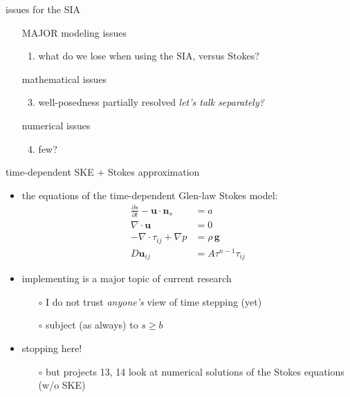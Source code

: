 \documentclass[10pt,dvipsnames]{beamer}
\newcommand{\comm}[1]{{\footnotesize \hfill \emph{#1}}}
\begin{document}
\begin{frame}{issues for the SIA}
\begin{itemize}
\item[] \alert{MAJOR modeling issues}
    \begin{enumerate}
    \item what do we lose when using the SIA, versus Stokes?
    \end{enumerate}
\item[] \alert{mathematical issues}
    \begin{enumerate}\setcounter{enumi}{2}
    \item well-posedness partially resolved \comm{let's talk separately?}
    \end{enumerate}
\item[] \alert{numerical issues}
    \begin{enumerate}\setcounter{enumi}{3}
    \item few?
    \end{enumerate}
\end{itemize}
\end{frame}


\begin{frame}{time-dependent SKE $+$ Stokes approximation}

\begin{itemize}
\item the equations of the \alert{time-dependent Glen-law Stokes model}:
\begin{align*}
\frac{\partial s}{\partial t} - \mathbf{u} \cdot \mathbf{n}_s &= a \\
\nabla \cdot \mathbf{u} &= 0 \\
-\nabla \cdot \tau_{ij} + \nabla p &= \rho\, \bm{g} \\
D\mathbf{u}_{ij} &= A \tau^{n-1} \tau_{ij}
\end{align*}
\item implementing is a major topic of current research
  \begin{itemize}
  \item[$\circ$] I do not trust \emph{anyone's} view of time stepping (yet)
  \item[$\circ$] subject (as always) to \alert{$s \ge b$}
  \end{itemize}
\item stopping here!
  \begin{itemize}
  \item[$\circ$] but projects 13, 14 look at numerical solutions of the Stokes equations (w/o SKE)
  \end{itemize}
\end{itemize}
\end{frame}
\end{document}
